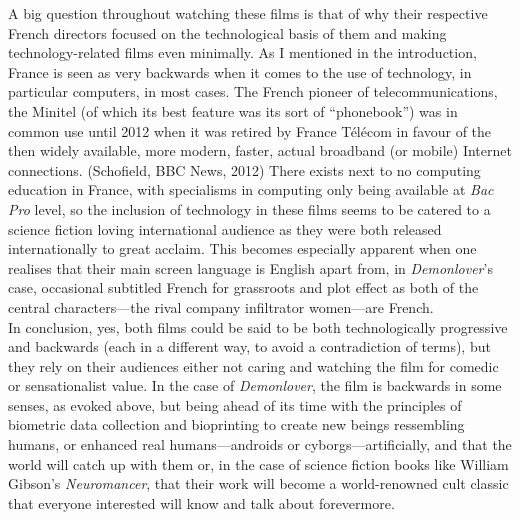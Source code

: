 \documentclass[12pt,a4paper]{article}
\begin{document}
A big question throughout watching these films is that of why their
respective French directors focused on the technological basis of them
and making technology-related films even minimally. As I mentioned in
the introduction, France is seen as very backwards when it comes to
the use of technology, in particular computers, in most cases. The
French pioneer of telecommunications, the Minitel (of which its best
feature was its sort of ``phonebook'') was in common use until 2012
when it was retired by France Télécom in favour of the then widely
available, more modern, faster, actual broadband (or mobile) Internet
connections. (Schofield, BBC News, 2012) There exists next to no
computing education in France, with specialisms in computing only
being available at \textit{Bac Pro} level, so the inclusion of
technology in these films seems to be catered to a science fiction
loving international audience as they were both released
internationally to great acclaim. This becomes especially apparent
when one realises that their main screen language is English apart
from, in \textit{Demonlover}'s case, occasional subtitled French for
grassroots and plot effect as both of the central characters---the
rival company infiltrator women---are French.\\

In conclusion, yes, both films could be said to be both
technologically progressive and backwards (each in a different way, to
avoid a contradiction of terms), but they rely on their audiences
either not caring and watching the film for comedic or sensationalist
value. In the case of \textit{Demonlover}, the film is backwards in
some senses, as evoked above, but being ahead of its time with the
principles of biometric data collection and bioprinting to create new
beings ressembling humans, or enhanced real humans---androids or
cyborgs---artificially, and that the world will catch up with them or,
in the case of science fiction books like William Gibson's
\textit{Neuromancer}, that their work will become a world-renowned
cult classic that everyone interested will know and talk about
forevermore.

\nocite{*}



\end{document}
